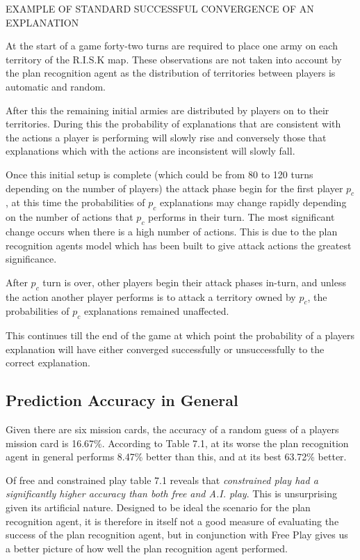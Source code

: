 \documentclass[parskip]{cs4rep}
\begin{document}
EXAMPLE OF STANDARD SUCCESSFUL CONVERGENCE OF AN EXPLANATION

At the start of a game forty-two turns are required to place one army on each territory of the R.I.S.K map. These observations are not taken into account by the plan recognition agent as the distribution of territories between players is automatic and random. 

After this the remaining initial armies are distributed by players on to their territories. During this the probability of explanations that are consistent with the actions a player is performing will slowly rise and conversely those that explanations which with the actions are inconsistent will slowly fall.

Once this initial setup is complete (which could be from 80 to 120 turns depending on the number of players) the attack phase begin for the first player $p_c$, at this time the probabilities of $p_c$ explanations may change rapidly depending on the number of actions that $p_c$ performs in their turn. The most significant change occurs when there is a high number of actions. This is due to the plan recognition agents model which has been built to give attack actions the greatest significance.

After $p_c$ turn is over, other players begin their attack phases in-turn, and unless the action another player performs is to attack a territory owned by $p_c$, the probabilities of $p_c$ explanations remained unaffected. 

This continues till the end of the game at which point the probability of a players explanation will have either converged successfully or unsuccessfully to the correct explanation. 

\subsection{Prediction Accuracy in General}

Given there are six mission cards, the accuracy of a random guess of a players mission card is 16.67\%. According to Table 7.1, at its worse the plan recognition agent in general performs 8.47\% better than this, and at its best 63.72\% better. 

Of free and constrained play table 7.1 reveals that \textit{constrained play had a significantly higher accuracy than both free and A.I. play}. This is unsurprising given its artificial nature. Designed to be ideal the scenario for the plan recognition agent, it is therefore in itself not a good measure of evaluating the success of the plan recognition agent, but in conjunction with Free Play gives us a better picture of how well the plan recognition agent performed.
\end{document}
